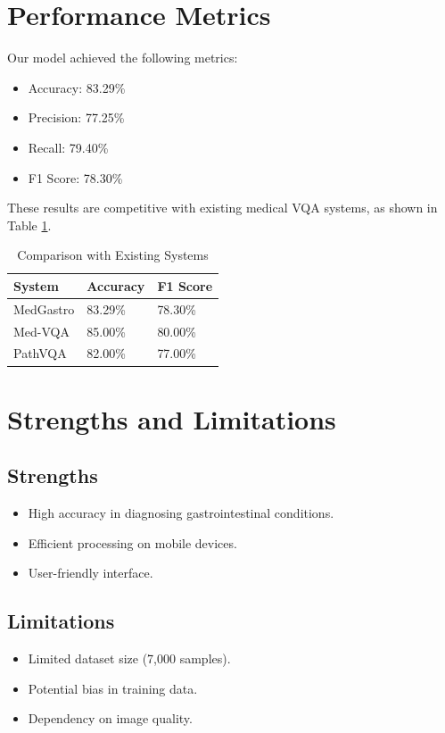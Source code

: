 \documentclass[12pt,a4paper]{report}
\begin{document}
\section{Performance Metrics}
Our model achieved the following metrics:
\begin{itemize}
    \item Accuracy: 83.29\%
    \item Precision: 77.25\%
    \item Recall: 79.40\%
    \item F1 Score: 78.30\%
\end{itemize}
These results are competitive with existing medical VQA systems, as shown in Table \ref{tab:comparison}.

\begin{table}[H]
\centering
\begin{tabular}{|l|l|l|}
\hline
\textbf{System} & \textbf{Accuracy} & \textbf{F1 Score} \\
\hline
MedGastro & 83.29\% & 78.30\% \\
Med-VQA \cite{medvqa2023} & 85.00\% & 80.00\% \\
PathVQA \cite{pathvqa2022} & 82.00\% & 77.00\% \\
\hline
\end{tabular}
\caption{Comparison with Existing Systems}
\label{tab:comparison}
\end{table}

\section{Strengths and Limitations}
\subsection{Strengths}
\begin{itemize}
    \item High accuracy in diagnosing gastrointestinal conditions.
    \item Efficient processing on mobile devices.
    \item User-friendly interface.
\end{itemize}

\subsection{Limitations}
\begin{itemize}
    \item Limited dataset size (7,000 samples).
    \item Potential bias in training data.
    \item Dependency on image quality.
\end{itemize}
\end{document}
